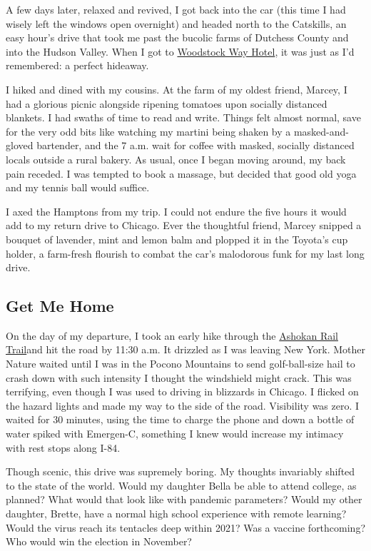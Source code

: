 A few days later, relaxed and revived, I got back into the car (this
time I had wisely left the windows open overnight) and headed north to
the Catskills, an easy hour's drive that took me past the bucolic farms
of Dutchess County and into the Hudson Valley. When I got to
\href{https://www.woodstockway.com/}{Woodstock Way Hotel}, it was just
as I'd remembered: a perfect hideaway.

I hiked and dined with my cousins. At the farm of my oldest friend,
Marcey, I had a glorious picnic alongside ripening tomatoes upon
socially distanced blankets. I had swaths of time to read and write.
Things felt almost normal, save for the very odd bits like watching my
martini being shaken by a masked-and-gloved bartender, and the 7 a.m.
wait for coffee with masked, socially distanced locals outside a rural
bakery. As usual, once I began moving around, my back pain receded. I
was tempted to book a massage, but decided that good old yoga and my
tennis ball would suffice.

I axed the Hamptons from my trip. I could not endure the five hours it
would add to my return drive to Chicago. Ever the thoughtful friend,
Marcey snipped a bouquet of lavender, mint and lemon balm and plopped it
in the Toyota's cup holder, a farm-fresh flourish to combat the car's
malodorous funk for my last long drive.

\hypertarget{get-me-home}{%
\subsection{Get Me Home}\label{get-me-home}}

On the day of my departure, I took an early hike through the
\href{https://ashokanrailtrail.com/}{Ashokan Rail Trail}and hit the road
by 11:30 a.m. It drizzled as I was leaving New York. Mother Nature
waited until I was in the Pocono Mountains to send golf-ball-size hail
to crash down with such intensity I thought the windshield might crack.
This was terrifying, even though I was used to driving in blizzards in
Chicago. I flicked on the hazard lights and made my way to the side of
the road. Visibility was zero. I waited for 30 minutes, using the time
to charge the phone and down a bottle of water spiked with Emergen-C,
something I knew would increase my intimacy with rest stops along I-84.

Though scenic, this drive was supremely boring. My thoughts invariably
shifted to the state of the world. Would my daughter Bella be able to
attend college, as planned? What would that look like with pandemic
parameters? Would my other daughter, Brette, have a normal high school
experience with remote learning? Would the virus reach its tentacles
deep within 2021? Was a vaccine forthcoming? Who would win the election
in November?

